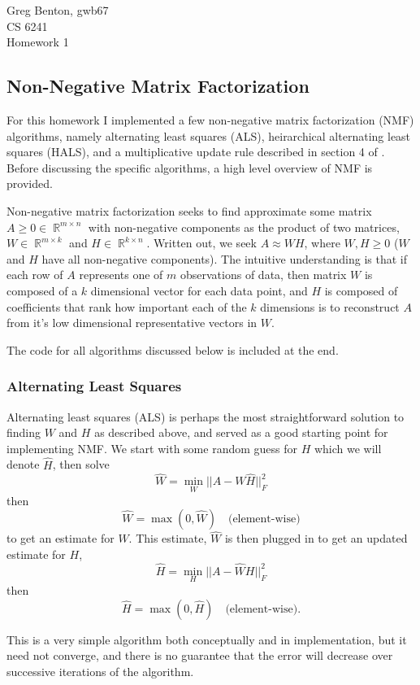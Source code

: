 \documentclass[12pt]{article}
\DeclareMathOperator{\RR}{\mathbb{R}}
\begin{document}
\noindent Greg Benton, gwb67\\
CS 6241\\
Homework 1\\

\subsection*{Non-Negative Matrix Factorization}

For this homework I implemented a few non-negative matrix factorization (NMF) algorithms, namely alternating least squares (ALS), heirarchical alternating least squares (HALS), and a multiplicative update rule described in section 4 of \cite{lee2001}. Before discussing the specific algorithms, a high level overview of NMF is provided.

Non-negative matrix factorization seeks to find approximate some matrix $A \geq 0 \in \RR^{m \times n}$ with non-negative components as the product of two matrices, $W\in \RR^{m\times k}$ and $H\in \RR^{k \times n}$.  Written out, we seek $A \approx WH$, where $W, H \geq 0$ ($W$ and $H$ have all non-negative components).
The intuitive understanding is that if each row of $A$ represents one of $m$ observations of data, then matrix $W$ is composed of a $k$ dimensional vector for each data point, and $H$ is composed of coefficients that rank how important each of the $k$ dimensions is to reconstruct $A$ from it's low dimensional representative vectors in $W$.

The code for all algorithms discussed below is included at the end.

\subsubsection*{Alternating Least Squares}
Alternating least squares (ALS) is perhaps the most straightforward solution to finding $W$ and $H$ as described above, and served as a good starting point for implementing NMF. We start with some random guess for $H$ which we will denote $\hat{H}$, then solve
\[
    \hat{W} = \min_{W}||A - W\hat{H}||_{F}^{2}
\]
then
\[
    \hat{W} = \max(0, \hat{W}) \quad \text{(element-wise)}
\]
to get an estimate for $W$. This estimate, $\hat{W}$ is then plugged in to get an updated estimate for $H$,
\[
    \hat{H} = \min_{H}||A - \hat{W}H||_{F}^2
\]
then
\[
    \hat{H} = \max(0, \hat{H}) \quad \text{(element-wise)}.
\]

This is a very simple algorithm both conceptually and in implementation, but it need not converge, and there is no guarantee that the error will decrease over successive iterations of the algorithm.
\end{document}
